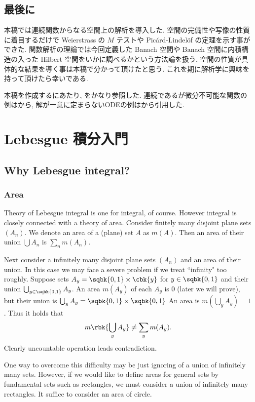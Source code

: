 \documentclass[openany, a4paper, oneside]{jsbook}
\begin{document}
\section{最後に}

本稿では連続関数からなる空間上の解析を導入した.
空間の完備性や写像の性質に着目するだけで Weierstrass の $M$ テストや Pic\'ard-Lindel\"of の定理を示す事ができた.
関数解析の理論では今回定義した Banach 空間や Banach 空間に内積構造の入った Hilbert 空間をいかに調べるかという方法論を扱う.
空間の性質が具体的な結果を導く事は本稿で分かって頂けたと思う.
これを期に解析学に興味を持って頂けたら幸いである.

本稿を作成するにあたり, \cite{JurgenJost1}をかなり参照した.
連続であるが微分不可能な関数の例は\cite{WilliamDunham1}から,
解が一意に定まらないODEの例は\cite{YoichiroTakahashi1}から引用した.
\chapter{Lebesgue 積分入門}

\section{Why Lebesgue integral?}

\subsection{Area}

Theory of Lebesgue integral is one for integral, of course.
However integral is closely connected with a theory of area.
Consider finitely many disjoint plane sets $(A_n)$.
We denote an area of a (plane) set $A$ as $m (A)$.
Then an area of their union $\bigcup A_n$ is $\sum_n m (A_n)$.

Next consider a infinitely many disjoint plane sets $(A_n)$ and an area of their union.
In this case we may face a severe problem if we treat ``infinity" too roughly.
Suppose sets $A_y = \sqbk{0, 1} \times \cbk{y}$ for $y \in \sqbk{0, 1}$
and their union $\bigcup_{y \in \sqbk{0, 1}} A_y$.
An area $m (A_y)$ of each $A_y$ is 0 (later we will prove), but their union is $\bigcup_y A_y = \sqbk{0, 1} \times \sqbk{0, 1}$
An area is $m (\bigcup_y A_y) = 1$.
Thus it holds that
\begin{align}
 m \rbk{ \bigcup_y A_y}
 \neq
 \sum_y m (A_y).
\end{align}
Clearly uncountable operation leads contradiction.

One way to overcome this difficulty may be just ignoring of a union of infinitely many sets.
However, if we would like to define areas for general sets by fundamental sets such as rectangles,
we must consider a union of infinitely many rectangles.
It suffice to consider an area of circle.
\end{document}
